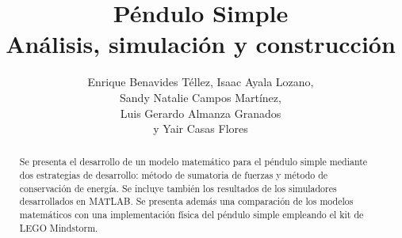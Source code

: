 \documentclass[letterpaper, 12pt]{article}
\begin{document}
\title{
Péndulo Simple\\
Análisis, simulación y construcción\\
}


\author{
    Enrique Benavides Téllez, Isaac Ayala Lozano,\\ 
    Sandy Natalie Campos Martínez,\\
    Luis Gerardo Almanza Granados\\
    y Yair Casas Flores
}

\date{}

\maketitle

\begin{abstract}



Se presenta el desarrollo de un modelo matemático
para el péndulo simple mediante dos estrategias de desarrollo:
método de sumatoria de fuerzas y método de conservación de energía.
Se incluye también los resultados de los simuladores desarrollados 
en MATLAB.
Se presenta además una comparación de los modelos matemáticos 
con una implementación física del péndulo simple empleando el 
kit de LEGO Mindstorm.

\end{abstract}








% 



\clearpage
% 
\printbibliography{}
\end{document}
